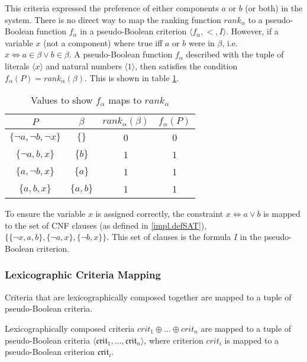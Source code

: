 This criteria expressed the preference of either components $a$ or $b$ (or both) in the system.
There is no direct way to map the ranking function $rank_{\alpha}$ to a pseudo-Boolean function $f_{\alpha}$ in a pseudo-Boolean criterion $\langle f_{\alpha}, < , I \rangle$.
However, if a variable $x$ (not a component) where true iff $a$ or $b$ were in $\beta$, i.e. $x \Leftrightarrow a \in \beta \vee b \in \beta$.
A pseudo-Boolean function $f_{\alpha}$ described with the tuple of literals $\langle x \rangle$ and natural numbers $\langle 1 \rangle$,
then satisfies the condition $f_{\alpha}(P) = rank_{\alpha}(\beta)$.
This is shown in table \ref{impl.critmapexmp}.
\begin{table}[h!]
\centering
\begin{tabular}{| c | c | c | c |}
\hline
$P$                                &    $\beta$            & $rank_{\alpha}(\beta)$     & $f_{\alpha}(P)$\\ \hline    
$\{\neg a, \neg b, \neg x\}$     & $\{\}$                & 0                        & 0 \\
$\{\neg a,  b, x\}$             & $\{b\}$                & 1                        & 1 \\
$\{ a,  \neg b, x\}$             & $\{a\}$                & 1                        & 1 \\
$\{ a,  b, x\}$                 & $\{a,b\}$                & 1                        & 1 \\ \hline
\end{tabular}
\caption{Values to show $f_{\alpha}$  maps to $rank_{\alpha}$}
\label{impl.critmapexmp}
\end{table}

To ensure the variable $x$ is assigned correctly, the constraint $x \Leftrightarrow a \vee b$ is mapped to the set of CNF clauses (as defined in \ref{impl.defSAT}),
$\{\{\neg x, a,b\}, \{\neg a,x\}, \{\neg b, x \}\}$.
This set of clauses is the formula $I$ in the pseudo-Boolean criterion.

\subsubsection{Lexicographic Criteria Mapping}
Criteria that are lexicographically composed together are mapped to a tuple of pseudo-Boolean criteria. 
\begin{defs}
Lexicographically composed criteria $crit_1 \oplus \ldots \oplus crit_n$ are mapped to a tuple of pseudo-Boolean criteria $\langle \mathfrak{crit}_1,\ldots,\mathfrak{crit}_n\rangle$,
where criterion $crit_i$ is mapped to a pseudo-Boolean criterion $\mathfrak{crit}_i$.
\end{defs}

